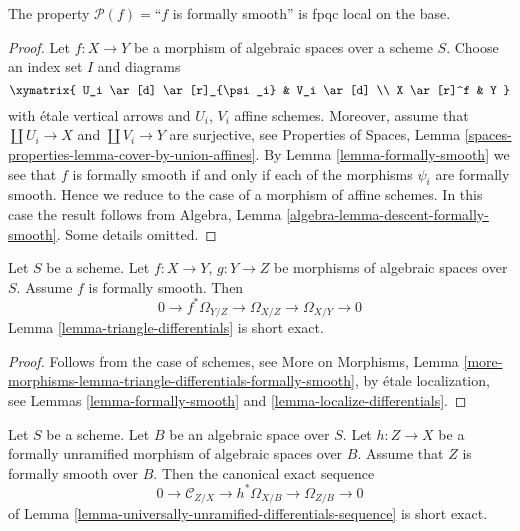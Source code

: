 \begin{lemma}
\label{lemma-descending-property-formally-smooth}
The property $\mathcal{P}(f) =$``$f$ is formally smooth''
is fpqc local on the base.
\end{lemma}

\begin{proof}
Let $f : X \to Y$ be a morphism of algebraic spaces over a scheme $S$.
Choose an index set $I$ and diagrams
$$
\xymatrix{
U_i \ar[d] \ar[r]_{\psi_i} & V_i \ar[d] \\
X \ar[r]^f & Y
}
$$
with \'etale vertical arrows and $U_i$, $V_i$ affine schemes. Moreover,
assume that $\coprod U_i \to X$ and $\coprod V_i \to Y$ are surjective, see
Properties of Spaces,
Lemma \ref{spaces-properties-lemma-cover-by-union-affines}.
By
Lemma \ref{lemma-formally-smooth}
we see that $f$ is formally smooth if and only if each of the morphisms
$\psi_i$ are formally smooth. Hence we reduce to the case of a morphism
of affine schemes. In this case the result follows from
Algebra, Lemma \ref{algebra-lemma-descent-formally-smooth}.
Some details omitted.
\end{proof}

\begin{lemma}
\label{lemma-triangle-differentials-formally-smooth}
Let $S$ be a scheme.
Let $f : X \to Y$, $g : Y \to Z$ be morphisms of algebraic spaces over $S$.
Assume $f$ is formally smooth. Then
$$
0 \to f^*\Omega_{Y/Z} \to \Omega_{X/Z} \to \Omega_{X/Y} \to 0
$$
Lemma \ref{lemma-triangle-differentials}
is short exact.
\end{lemma}

\begin{proof}
Follows from the case of schemes, see
More on Morphisms,
Lemma \ref{more-morphisms-lemma-triangle-differentials-formally-smooth},
by \'etale localization, see
Lemmas \ref{lemma-formally-smooth} and \ref{lemma-localize-differentials}.
\end{proof}

\begin{lemma}
\label{lemma-differentials-formally-unramified-formally-smooth}
Let $S$ be a scheme. Let $B$ be an algebraic space over $S$.
Let $h : Z \to X$ be a formally unramified morphism of algebraic spaces
over $B$.
Assume that $Z$ is formally smooth over $B$. Then the
canonical exact sequence
$$
0 \to \mathcal{C}_{Z/X} \to h^*\Omega_{X/B} \to \Omega_{Z/B} \to 0
$$
of
Lemma \ref{lemma-universally-unramified-differentials-sequence}
is short exact.
\end{lemma}

